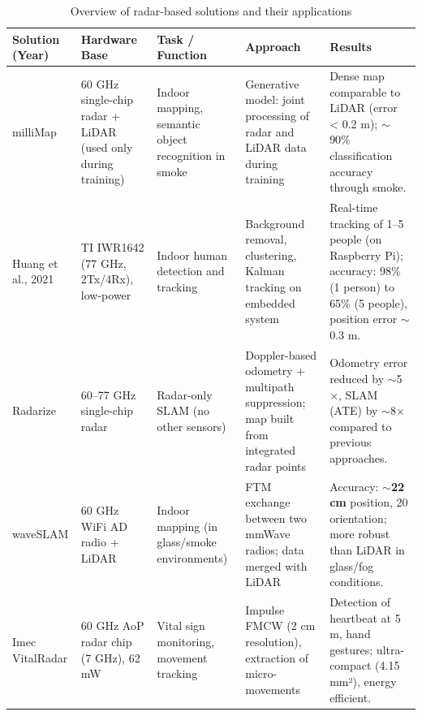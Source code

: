 \begin{table}[h]
    \centering
    \small
    \caption{Overview of radar-based solutions and their applications}
    \label{tab:radar_solutions}
    \begin{tabular}{|p{1.5cm}|p{2.5cm}|p{2.5cm}|p{4cm}|p{4.5cm}|}
        \hline
        \textbf{Solution (Year)} & \textbf{Hardware Base} & \textbf{Task / Function} & \textbf{Approach} & \textbf{Results} \\ \hline

        milliMap  & 60 GHz single-chip radar + LiDAR (used only during training) & Indoor mapping, semantic object recognition in smoke & Generative model: joint processing of radar and LiDAR data during training & Dense map comparable to LiDAR (error < 0.2 m); $\sim$90\% classification accuracy through smoke. \\ \hline

        Huang et al., 2021 & TI IWR1642 (77 GHz, 2Tx/4Rx), low-power & Indoor human detection and tracking & Background removal, clustering, Kalman tracking on embedded system & Real-time tracking of 1–5 people (on Raspberry Pi); accuracy: 98\% (1 person) to 65\% (5 people), position error $\sim$0.3 m. \\ \hline

        Radarize& 60–77 GHz single-chip radar & Radar-only SLAM (no other sensors) & Doppler-based odometry + multipath suppression; map built from integrated radar points & Odometry error reduced by $\sim$5$\times$, SLAM (ATE) by $\sim$8$\times$ compared to previous approaches. \\ \hline

        waveSLAM  & 60 GHz WiFi AD radio + LiDAR & Indoor mapping (in glass/smoke environments) & FTM exchange between two mmWave radios; data merged with LiDAR & Accuracy: $\sim$\textbf{22 cm} position, 20\textdegree{} orientation; more robust than LiDAR in glass/fog conditions. \\ \hline

        Imec VitalRadar & 60 GHz AoP radar chip (7 GHz), 62 mW & Vital sign monitoring, movement tracking & Impulse FMCW (2 cm resolution), extraction of micro-movements & Detection of heartbeat at 5 m, hand gestures; ultra-compact (4.15 mm²), energy efficient. \\ \hline
    \end{tabular}

\end{table}


